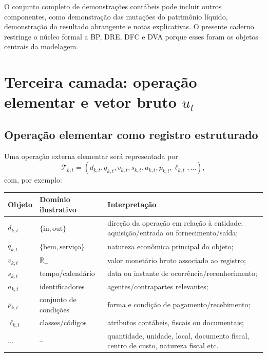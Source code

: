 \documentclass[11pt,a4paper]{article}
\newcommand{\R}{\mathbb{R}}
\newcommand{\cT}{\mathcal{T}}
\begin{document}
\begin{cuidado}
O conjunto completo de demonstrações contábeis pode incluir outros componentes, como demonstração das mutações do patrimônio líquido, demonstração do resultado abrangente e notas explicativas. O presente caderno restringe o núcleo formal a BP, DRE, DFC e DVA porque esses foram os objetos centrais da modelagem.
\end{cuidado}

\section[Terceira camada: operação elementar e vetor bruto u t]{Terceira camada: operação elementar e vetor bruto $u_t$}

\subsection{Operação elementar como registro estruturado}

Uma operação externa elementar será representada por
\begin{equation}
\boxed{\cT_{k,t}=(d_{k,t},q_{k,t},v_{k,t},s_{k,t},a_{k,t},p_{k,t},\ell_{k,t},\ldots),}
\label{eq:transacao-array}
\end{equation}
com, por exemplo:

\begin{longtable}{p{} p{} p{}}
\toprule
\textbf{Objeto} & \textbf{Domínio ilustrativo} & \textbf{Interpretação}\\
\midrule
$d_{k,t}$ & $\{\mathrm{in},\mathrm{out}\}$ & direção da operação em relação à entidade: aquisição/entrada ou fornecimento/saída;\\
$q_{k,t}$ & $\{\text{bem},\text{serviço}\}$ & natureza econômica principal do objeto;\\
$v_{k,t}$ & $\R_+$ & valor monetário bruto associado ao registro;\\
$s_{k,t}$ & tempo/calendário & data ou instante de ocorrência/reconhecimento;\\
$a_{k,t}$ & identificadores & agentes/contrapartes relevantes;\\
$p_{k,t}$ & conjunto de condições & forma e condição de pagamento/recebimento;\\
$\ell_{k,t}$ & classes/códigos & atributos contábeis, fiscais ou documentais;\\
$\ldots$ & -- & quantidade, unidade, local, documento fiscal, centro de custo, natureza fiscal etc.\\
\bottomrule
\end{longtable}
\end{document}
